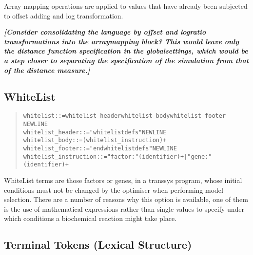 \documentclass[a4paper,fleqn]{article}
\newcommand{\todo}[1]{\rule{0pt}{0pt}\marginpar{\rule{1ex}{1ex}}\textbf{\emph{[#1]}}}
\newenvironment{ebnfrule}{\begin{footnotesize}\begin{quote}\begin{alltt}}{\end{alltt}\end{quote}\end{footnotesize}}
\begin{document}
Array mapping operations are applied to values that have already been
subjected to offset adding and log transformation.

\todo{Consider consolidating the language by offset and logratio
  transformations into the arraymapping block? This would leave only
  the distance function specification in the globalsettings, which
  would be a step closer to separating the specification of the
  simulation from that of the distance measure.}
\cite{Parkinson2009}

\subsection{WhiteList}

\begin{ebnfrule}
whitelist ::= whitelist_header whitelist_body whitelist_footer
NEWLINE
whitelist_header ::= "whitelistdefs" NEWLINE
whitelist_body ::= (whitelist_instruction)+
whitelist_footer ::= "endwhitelistdefs" NEWLINE
whitelist_instruction ::= "factor: " (identifier)+ | "gene: " (identifier)+ 
\end{ebnfrule}

WhiteList terms are those factors or genes, in a transsys program, whose
initial conditions must not be changed by the optimiser when performing
model selection. There are a number of reasons why this option is available, 
one of them is the use of mathematical expressions rather than single values
to specify under which conditions a biochemical reaction might take place.

\subsection{Terminal Tokens (Lexical Structure)}
\end{document}
